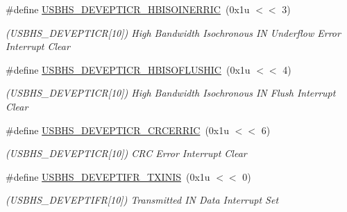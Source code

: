 \begin{DoxyCompactItemize}
\mbox{\label{group__SAMV71__USBHS_ga545da4a14b5d0a1116acefa6b9f9ef06}} 
\#define \mbox{\hyperlink{group__SAMV71__USBHS_ga545da4a14b5d0a1116acefa6b9f9ef06}{U\+S\+B\+H\+S\+\_\+\+D\+E\+V\+E\+P\+T\+I\+C\+R\+\_\+\+H\+B\+I\+S\+O\+I\+N\+E\+R\+R\+IC}}~(0x1u $<$$<$ 3)
\begin{DoxyCompactList}\small\item\em (U\+S\+B\+H\+S\+\_\+\+D\+E\+V\+E\+P\+T\+I\+CR\mbox{[}10\mbox{]}) High Bandwidth Isochronous IN Underflow Error Interrupt Clear \end{DoxyCompactList}\item 
\mbox{\label{group__SAMV71__USBHS_gaf7a950038e2e41020695d1a43f25593b}} 
\#define \mbox{\hyperlink{group__SAMV71__USBHS_gaf7a950038e2e41020695d1a43f25593b}{U\+S\+B\+H\+S\+\_\+\+D\+E\+V\+E\+P\+T\+I\+C\+R\+\_\+\+H\+B\+I\+S\+O\+F\+L\+U\+S\+H\+IC}}~(0x1u $<$$<$ 4)
\begin{DoxyCompactList}\small\item\em (U\+S\+B\+H\+S\+\_\+\+D\+E\+V\+E\+P\+T\+I\+CR\mbox{[}10\mbox{]}) High Bandwidth Isochronous IN Flush Interrupt Clear \end{DoxyCompactList}\item 
\mbox{\label{group__SAMV71__USBHS_ga113daf9e53959a559925a35d5e5fd7cd}} 
\#define \mbox{\hyperlink{group__SAMV71__USBHS_ga113daf9e53959a559925a35d5e5fd7cd}{U\+S\+B\+H\+S\+\_\+\+D\+E\+V\+E\+P\+T\+I\+C\+R\+\_\+\+C\+R\+C\+E\+R\+R\+IC}}~(0x1u $<$$<$ 6)
\begin{DoxyCompactList}\small\item\em (U\+S\+B\+H\+S\+\_\+\+D\+E\+V\+E\+P\+T\+I\+CR\mbox{[}10\mbox{]}) C\+RC Error Interrupt Clear \end{DoxyCompactList}\item 
\mbox{\label{group__SAMV71__USBHS_gad5da0b534cb39cd8d5476f606569a6d6}} 
\#define \mbox{\hyperlink{group__SAMV71__USBHS_gad5da0b534cb39cd8d5476f606569a6d6}{U\+S\+B\+H\+S\+\_\+\+D\+E\+V\+E\+P\+T\+I\+F\+R\+\_\+\+T\+X\+I\+N\+IS}}~(0x1u $<$$<$ 0)
\begin{DoxyCompactList}\small\item\em (U\+S\+B\+H\+S\+\_\+\+D\+E\+V\+E\+P\+T\+I\+FR\mbox{[}10\mbox{]}) Transmitted IN Data Interrupt Set \end{DoxyCompactList}\item 

\end{DoxyCompactItemize}
